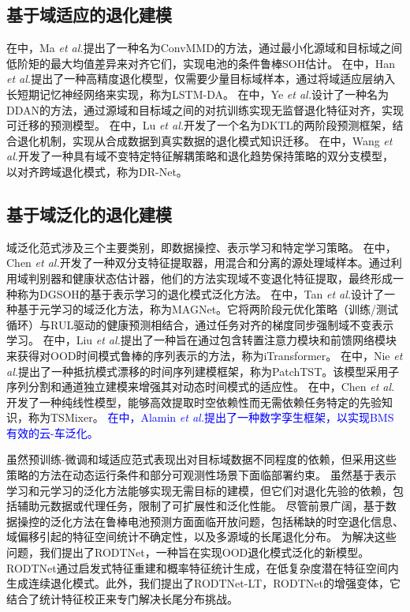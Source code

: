 \documentclass[UTF8,lettersize,journal]{IEEEtran}
\newcommand{\rev}[1]{\textcolor{blue}{#1}}
\begin{document}
\subsection{基于域适应的退化建模}

在\cite{9788003}中，Ma \emph{et al.}提出了一种名为ConvMMD的方法，通过最小化源域和目标域之间低阶矩的最大均值差异来对齐它们，实现电池的条件鲁棒SOH估计。
在\cite{HAN2022230823}中，Han \emph{et al.}提出了一种高精度退化模型，仅需要少量目标域样本，通过将域适应层纳入长短期记忆神经网络来实现，称为LSTM-DA。
在\cite{9560040}中，Ye \emph{et al.}设计了一种名为DDAN的方法，通过源域和目标域之间的对抗训练实现无监督退化特征对齐，实现可迁移的预测模型。
在\cite{10029904}中，Lu \emph{et al.}开发了一个名为DKTL的两阶段预测框架，结合退化机制，实现从合成数据到真实数据的退化模式知识迁移。
在\cite{WANG2023108897}中，Wang \emph{et al.}开发了一种具有域不变特定特征解耦策略和退化趋势保持策略的双分支模型，以对齐跨域退化模式，称为DR-Net。

\subsection{基于域泛化的退化建模}

域泛化范式涉及三个主要类别，即数据操控、表示学习和特定学习策略\cite{9782500}。
在\cite{CHEN2024234696}中，Chen \emph{et al.}开发了一种双分支特征提取器，用混合和分离的源处理域样本。通过利用域判别器和健康状态估计器，他们的方法实现域不变退化特征提取，最终形成一种称为DGSOH的基于表示学习的退化模式泛化方法。
在\cite{TAN2024103725}中，Tan \emph{et al.}设计了一种基于元学习的域泛化方法，称为MAGNet。它将两阶段元优化策略（训练/测试循环）与RUL驱动的健康预测相结合，通过任务对齐的梯度同步强制域不变表示学习。
在\cite{liu2024itransformer}中，Liu \emph{et al.}提出了一种旨在通过包含转置注意力模块和前馈网络模块来获得对OOD时间模式鲁棒的序列表示的方法，称为iTransformer。
在\cite{nie2023a}中，Nie \emph{et al.}提出了一种抵抗模式漂移的时间序列建模框架，称为PatchTST。该模型采用子序列分割和通道独立建模来增强其对动态时间模式的适应性。
在\cite{chen2023tsmixer}中，Chen \emph{et al.}开发了一种纯线性模型，能够高效提取时空依赖性而无需依赖任务特定的先验知识，称为TSMixer。
% 
\rev{在\cite{10980357}中，Alamin \emph{et al.}提出了一种数字孪生框架，以实现BMS有效的云-车泛化。}

虽然预训练-微调和域适应范式表现出对目标域数据不同程度的依赖，但采用这些策略的方法在动态运行条件和部分可观测性场景下面临部署约束。
虽然基于表示学习和元学习的泛化方法能够实现无需目标的建模，但它们对退化先验的依赖，包括辅助元数据或代理任务，限制了可扩展性和泛化性能。
% 
尽管前景广阔，基于数据操控的泛化方法在鲁棒电池预测方面面临开放问题，包括稀缺的时空退化信息、域偏移引起的特征空间统计不确定性，以及多源域的长尾退化分布。
为解决这些问题，我们提出了RODTNet，一种旨在实现OOD退化模式泛化的新模型。RODTNet通过启发式特征重建和概率特征统计生成，在低复杂度潜在特征空间内生成连续退化模式。此外，我们提出了RODTNet-LT，RODTNet的增强变体，它结合了统计特征校正来专门解决长尾分布挑战。
\end{document}

